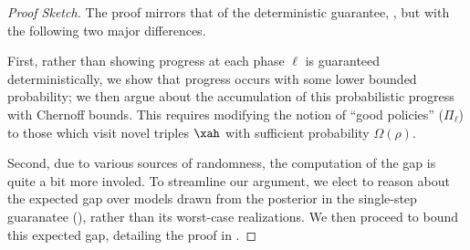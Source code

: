 \begin{proof}[Proof Sketch] The proof mirrors that of the deterministic guarantee, ,  but with the following two major differences.

First, rather than showing progress at each phase $\ell$ is guaranteed deterministically, we show that progress occurs with some lower bounded probability; we then argue about the accumulation of this probabilistic progress with Chernoff bounds. This requires modifying the notion of ``good policies'' ($\Pi_{\ell}$) to those which visit novel triples $\xah$ with sufficient probability $\Omega(\rho)$.

Second, due to various sources of randomness, the computation of the gap is quite a bit more involed. To streamline our argument, we elect to reason about the expected gap over models drawn from the posterior in the single-step guaranatee (), rather than its worst-case realizations. We then proceed to bound this expected gap, detailing the proof in .
\end{proof}

